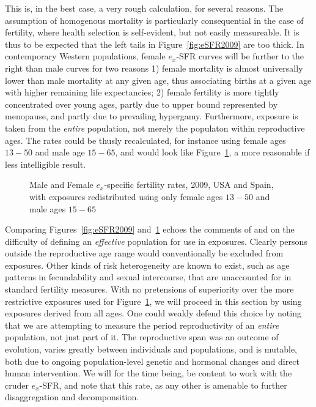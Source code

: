 This is, in the best case, a very rough calculation, for several reasons. The
assumption of homogenous mortality is particularly consequential in the case of 
fertility, where health selection is self-evident, but not easily measureable.
It is thus to be expected that the left tails in Figure~\ref{fig:eSFR2009} are
too thick. In contemporary Western populations, female $e_x$-SFR curves will be
further to the right than male curves for two reasons 1) female mortality is
almost universally lower than male mortality at any given age, thus associating
births at a given age with higher remaining life expectancies; 2)
female fertility is more tightly concentrated over young ages, partly due to
upper bound represented by menopause, and partly due to prevailing hypergamy.
Furthermore, exposure is taken from the \textit{entire} population, not merely
the populaton within reproductive ages. The rates could be thusly recalculated,
for instance using female ages $13-50$ and male age $15-65$, and would look like 
Figure~\ref{fig:eSFR2009limits}, a more reasonable if less intelligible result.

\begin{figure}[ht!]
        \centering  
          \caption{Male and Female $e_x$-specific fertility rates, 2009, USA and
          Spain, with exposures redistributed using only female ages $13-50$ and
          male ages $15-65$}
          \label{fig:eSFR2009limits}
\end{figure}

Comparing Figures~\ref{fig:eSFR2009} and~\ref{fig:eSFR2009limits} echoes the
comments of \citet{gupta1978alternative} and \citet{mitra1976effect} on the difficulty of
defining an \textit{effective} population for use in exposures. Clearly persons
outside the reproductive age range would conventionally be excluded from
exposures. Other kinds of risk heterogeneity are known to exist, such as age
patterns in fecundability and sexual intercourse, that are unaccounted for in
standard fertility measures. With no pretensions of superiority over the more
restrictive exposures used for Figure~\ref{fig:eSFR2009limits}, we will proceed
in this section by using exposures derived from all ages. One could weakly
defend this choice by noting that we are attempting to measure the period
reproductivity of an \textit{entire} population, not just part of it. The
reproductive span was an outcome of evolution, varies greatly between
individuals and populations, and is mutable, both due to ongoing
population-level genetic and hormonal changes and direct human intervention. We
will for the time being, be content to work with the cruder $e_x$-SFR, and note
that this rate, as any other is amenable to further disaggregation and
decomponsition.

